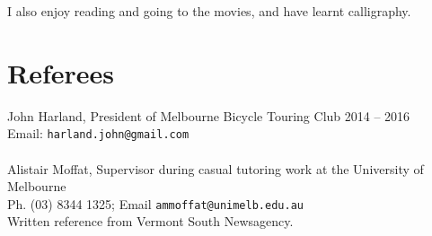 \documentclass[a4paper]{article}
\begin{document}
I also enjoy reading and going to the movies, and have learnt calligraphy.



\section{Referees}
John Harland, President of Melbourne Bicycle Touring Club 2014 -- 2016\\
Email: \texttt{harland.john@gmail.com}\\ \\
Alistair Moffat, Supervisor during casual tutoring work at the University
of Melbourne\\
Ph. (03) 8344 1325; Email \texttt{ammoffat@unimelb.edu.au}\\
Written reference from Vermont South Newsagency.
\end{document}
